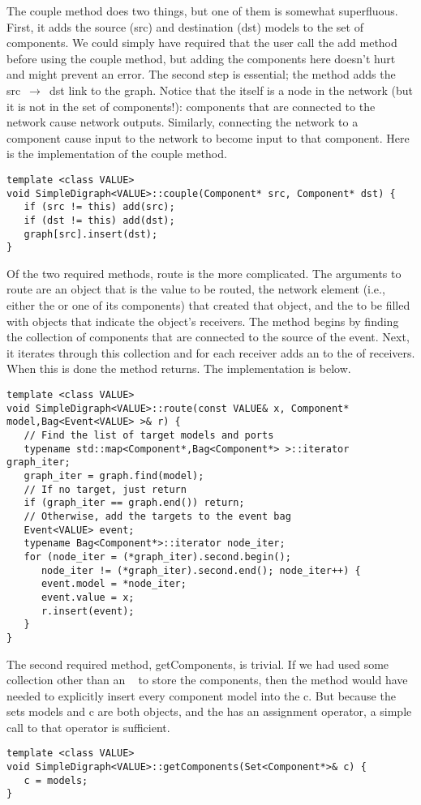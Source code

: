The couple method does two things, but one of them is somewhat superfluous. First, it adds the source (src) and destination (dst) models to the set of components. We could simply have required that the user call the add method before using the couple method, but adding the components here doesn't hurt and might prevent an error. The second step is essential; the method adds the \mbox{src $\rightarrow$ dst} link to the graph. Notice that the  itself is a node in the network (but it is not in the set of components!): components that are connected to the network cause network outputs. Similarly, connecting the network to a component cause input to the network to become input to that component. Here is the implementation of the couple method.
\begin{verbatim}
template <class VALUE>
void SimpleDigraph<VALUE>::couple(Component* src, Component* dst) { 
   if (src != this) add(src);
   if (dst != this) add(dst);
   graph[src].insert(dst);
}
\end{verbatim}

Of the two required methods, route is the more complicated. The arguments to route are an object that is the value to be routed, the network element (i.e., either the  or one of its components) that created that object, and the  to be filled with  objects that indicate the object's receivers. The method begins by finding the collection of components that are connected to the source of the event. Next, it iterates through this collection and for each receiver adds an  to the  of receivers. When this is done the method returns. The implementation is below.
\begin{verbatim}
template <class VALUE>
void SimpleDigraph<VALUE>::route(const VALUE& x, Component* model,Bag<Event<VALUE> >& r) {
   // Find the list of target models and ports
   typename std::map<Component*,Bag<Component*> >::iterator graph_iter;
   graph_iter = graph.find(model);
   // If no target, just return
   if (graph_iter == graph.end()) return;
   // Otherwise, add the targets to the event bag
   Event<VALUE> event;
   typename Bag<Component*>::iterator node_iter;
   for (node_iter = (*graph_iter).second.begin();
      node_iter != (*graph_iter).second.end(); node_iter++) {
      event.model = *node_iter;
      event.value = x;
      r.insert(event);
   }
}
\end{verbatim}

The second required method, getComponents, is trivial. If we had used some collection other than an \adevs\  to store the components, then the method would have needed to explicitly insert every component model into the  c. But because the sets models and c are both  objects, and the  has an assignment operator, a simple call to that operator is sufficient.
\begin{verbatim}
template <class VALUE>
void SimpleDigraph<VALUE>::getComponents(Set<Component*>& c) {
   c = models;
}
\end{verbatim}

